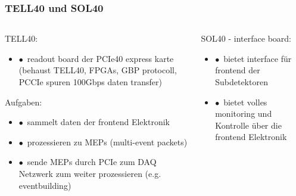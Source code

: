 \documentclass[aspectratio=1610, 12pt, xcolor=dvipsnames]{beamer}
\begin{document}
\begin{frame}\frametitle{TELL40 und SOL40}
  \begin{columns}
    \begin{column}[c]{0.48\textwidth}
      TELL40:
      \begin{itemize}
        \item $\bullet$\, readout board der PCIe40 express karte (behaust TELL40, FPGAs, GBP protocoll, PCCIe spuren \to 100Gbps daten transfer)
      \end{itemize}
      Aufgaben:
      \begin{itemize}
        \item $\bullet$\, sammelt daten der frontend Elektronik
        \item $\bullet$\, prozessieren zu MEPs (multi-event packets)
        \item $\bullet$\, sende MEPs durch PCIe zum DAQ Netzwerk zum weiter prozessieren (e.g. eventbuilding)
      \end{itemize}
    \end{column}
    \begin{column}[c]{0.48\textwidth}
      SOL40 - interface board:
      \begin{itemize}
        \item $\bullet$\, bietet interface für frontend der Subdetektoren
        \item $\bullet$\, bietet volles monitoring und Kontrolle über die frontend Elektronik
      \end{itemize}
    \end{column}
  \end{columns}
\end{frame}
\end{document}
